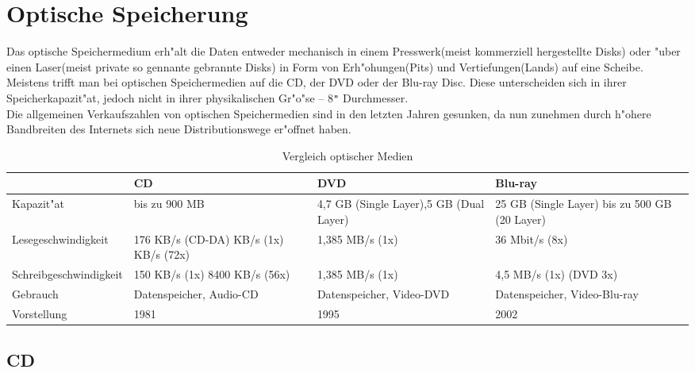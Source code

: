     
    \section{Optische Speicherung}
    \label{ch:Technisch:sec:Optische Speicherung}
    
        Das optische Speichermedium erh"alt die Daten entweder mechanisch in einem Presswerk(meist kommerziell hergestellte Disks) oder "uber einen Laser(meist private so gennante \glqq gebrannte\grqq{} Disks) in Form von Erh"ohungen(Pits) und Vertiefungen(Lands) auf eine Scheibe. Meistens trifft man bei optischen Speichermedien auf die CD, der DVD oder der Blu-ray Disc. Diese unterscheiden sich in ihrer Speicherkapazit"at, jedoch nicht in ihrer physikalischen Gr"o"se – 8\texttt{"{}} Durchmesser.
        \\
         Die allgemeinen Verkaufszahlen von optischen Speichermedien sind in den letzten Jahren gesunken, da nun zunehmen durch h"ohere Bandbreiten des Internets sich neue Distributionswege er"offnet haben.

        
{%
\label{ch:Technisch:sec:Optische SpeicherungM}     
\begin{table}[ht]
\small
\begin{tabular}{|p{3.8cm}|p{3.2cm}|p{3cm}|p{3cm}|}
\hline
~ & CD & DVD & Blu-ray \\ \hline
Kapazit"at & bis zu 900 MB & 4,7 GB (Single Layer)\newline 8,5 GB (Dual Layer)  & 25 GB (Single Layer) bis zu 500 GB (20 Layer) \\  \hline
Lesegeschwindigkeit & 176 KB/s (CD-DA)\newline 150 KB/s (1x) \newline 10800 KB/s (72x) & 1,385 MB/s (1x) & 36 Mbit/s (8x) \\ \hline
Schreibgeschwindigkeit & 150 KB/s (1x)  8400 KB/s (56x) & 1,385 MB/s (1x) & 4,5 MB/s (1x) (DVD 3x) \\ \hline
Gebrauch & Datenspeicher, Audio-CD & Datenspeicher, Video-DVD & Datenspeicher, Video-Blu-ray \\ \hline
Vorstellung & 1981 & 1995 & 2002 \\
\hline
\end{tabular}
\caption{Vergleich optischer Medien}
\label{tab:vlgOptMed}
\end{table}
}%


        \subsection{CD}
        \label{ch:Technisch:sec:Optische Speicherung:sub:CD}
        
